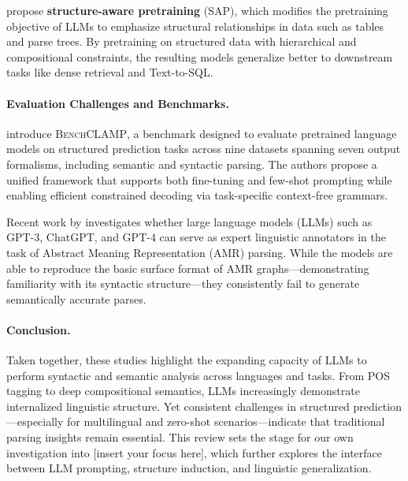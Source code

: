 \citet{li2023structure} propose \textbf{structure-aware pretraining} (SAP), which modifies the pretraining objective of LLMs to emphasize structural relationships in data such as tables and parse trees. By pretraining on structured data with hierarchical and compositional constraints, the resulting models generalize better to downstream tasks like dense retrieval and Text-to-SQL.

\paragraph{Evaluation Challenges and Benchmarks.} \citet{bharadwaj2023benchclamp} introduce \textsc{BenchCLAMP}, a benchmark designed to evaluate pretrained language models on structured prediction tasks across nine datasets spanning seven output formalisms, including semantic and syntactic parsing. The authors propose a unified framework that supports both fine-tuning and few-shot prompting while enabling efficient constrained decoding via task-specific context-free grammars.

Recent work by \cite{ettinger2023expert} investigates whether large language models (LLMs) such as GPT-3, ChatGPT, and GPT-4 can serve as expert linguistic annotators in the task of Abstract Meaning Representation (AMR) parsing. While the models are able to reproduce the basic surface format of AMR graphs—demonstrating familiarity with its syntactic structure—they consistently fail to generate semantically accurate parses.

\paragraph{Conclusion.} Taken together, these studies highlight the expanding capacity of LLMs to perform syntactic and semantic analysis across languages and tasks. From POS tagging to deep compositional semantics, LLMs increasingly demonstrate internalized linguistic structure. Yet consistent challenges in structured prediction—especially for multilingual and zero-shot scenarios—indicate that traditional parsing insights remain essential. This review sets the stage for our own investigation into [insert your focus here], which further explores the interface between LLM prompting, structure induction, and linguistic generalization.

